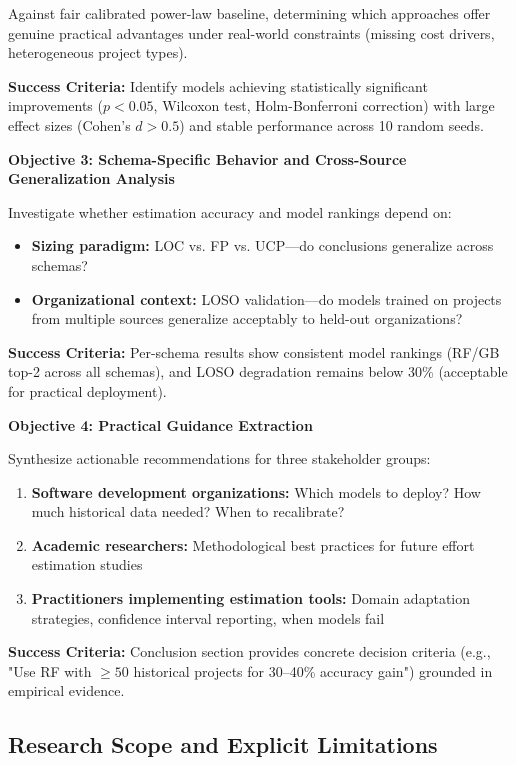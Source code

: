 \documentclass[11pt,a4paper]{article}
\begin{document}
Against fair calibrated power-law baseline, determining which approaches offer genuine practical advantages under real-world constraints (missing cost drivers, heterogeneous project types).

\textbf{Success Criteria:} Identify models achieving statistically significant improvements ($p < 0.05$, Wilcoxon test, Holm-Bonferroni correction) with large effect sizes (Cohen's $d > 0.5$) and stable performance across 10 random seeds.

\textbf{Objective 3: Schema-Specific Behavior and Cross-Source Generalization Analysis}

Investigate whether estimation accuracy and model rankings depend on:
\begin{itemize}
    \item \textbf{Sizing paradigm:} LOC vs. FP vs. UCP---do conclusions generalize across schemas?
    \item \textbf{Organizational context:} LOSO validation---do models trained on projects from multiple sources generalize acceptably to held-out organizations?
\end{itemize}

\textbf{Success Criteria:} Per-schema results show consistent model rankings (RF/GB top-2 across all schemas), and LOSO degradation remains below 30\% (acceptable for practical deployment).

\textbf{Objective 4: Practical Guidance Extraction}

Synthesize actionable recommendations for three stakeholder groups:
\begin{enumerate}
    \item \textbf{Software development organizations:} Which models to deploy? How much historical data needed? When to recalibrate?
    \item \textbf{Academic researchers:} Methodological best practices for future effort estimation studies
    \item \textbf{Practitioners implementing estimation tools:} Domain adaptation strategies, confidence interval reporting, when models fail
\end{enumerate}

\textbf{Success Criteria:} Conclusion section provides concrete decision criteria (e.g., "Use RF with $\geq 50$ historical projects for 30--40\% accuracy gain") grounded in empirical evidence.

\subsection{Research Scope and Explicit Limitations}
\end{document}
